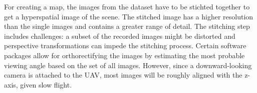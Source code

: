 For creating a map, the images from the dataset have to be stichted
together to get a hyperspatial image of the scene. The stitched image has a higher resolution than the
single images and contains a greater range of detail. The stitching
step includes challenges: a subset of the recorded images might be
distorted and perspective
transformations can impede the stitching process. Certain software packages allow for orthorectifying the images
 by estimating the most probable viewing angle based on
the set of all images. However, since a downward-looking camera is attached to
the UAV, most images will be roughly aligned with the z-axis, given
slow flight.